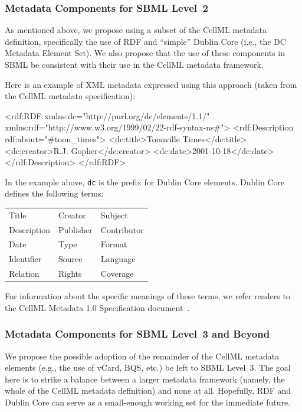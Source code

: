 \documentclass[10pt]{cekarticle}
\begin{document}
\subsubsection{Metadata Components for SBML Level~2}

As mentioned above, we propose using a subset of the CellML metadata
definition, specifically the use of RDF and ``simple'' Dublin Core (i.e.,
the DC Metadata Element Set).  We also propose that the use of these
components in SBML be consistent with their use in the CellML metadata
framework.

Here is an example of XML metadata expressed using this approach (taken
from the CellML metadata specification):
\begin{example}
<rdf:RDF xmlns:dc="http://purl.org/dc/elements/1.1/"
         xmlns:rdf="http://www.w3.org/1999/02/22-rdf-syntax-ns#">
  <rdf:Description rdf:about="#toon_times">
    <dc:title>Toonville Times</dc:title>
    <dc:creator>R.J. Gopher</dc:creator>
    <dc:date>2001-10-18</dc:date>
  </rdf:Description>
</rdf:RDF> 
\end{example}

In the example above, \texttt{dc} is the prefix for Dublin Core elements.
Dublin Core defines the following terms:
\begin{center}
\begin{tabular}{>{\ttfamily}l>{\ttfamily}l>{\ttfamily}l}
Title		& Creator 	& Subject \\
Description 	& Publisher	& Contributor \\
Date		& Type 		& Format \\
Identifier 	& Source	& Language \\
Relation	& Rights	& Coverage\\
\end{tabular}
\end{center}
For information about the specific meanings of these terms, we refer
readers to the CellML Metadata 1.0 Specification
document~\citep{cuellar:2002}.


\subsubsection{Metadata Components for SBML Level~3 and Beyond}

We propose the possible adoption of the remainder of the CellML metadata
elements (e.g., the use of vCard, BQS, etc.) be left to SBML Level~3.  The
goal here is to strike a balance between a larger metadata framework
(namely, the whole of the CellML metadata definition) and none at all.
Hopefully, RDF and Dublin Core can serve as a small-enough working set for
the immediate future.
\end{document}

